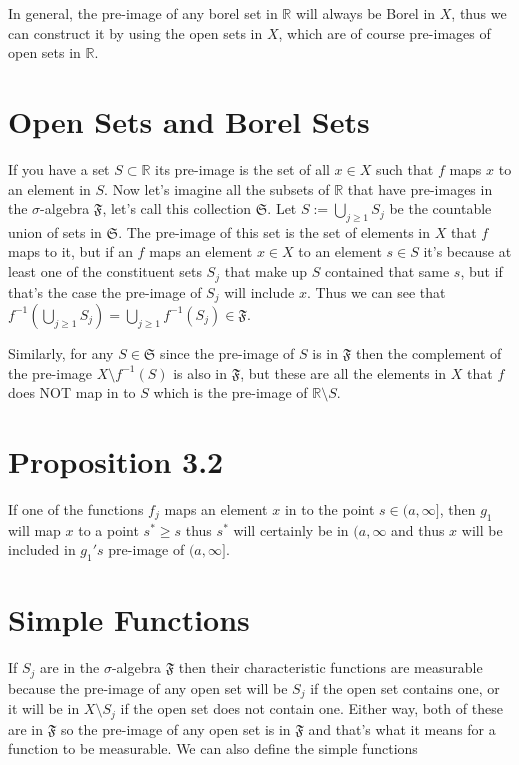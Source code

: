 \documentclass[oneside]{book}
\begin{document}
In general, the pre-image of any borel set in $\mathbb{R}$ will always be Borel in $X$, thus we can construct it by using the open sets in $X$, which are of course pre-images of open sets in $\mathbb{R}$.

\section{Open Sets and Borel Sets}
If you have a set $S \subset \mathbb{R}$ its pre-image is the set of all $x \in X$ such that $f$ maps $x$ to an element in $S$. Now let's imagine all the subsets of $\mathbb{R}$ that have pre-images in the $\sigma$-algebra $\mathfrak{F}$, let's call this collection $\mathfrak{S}$. Let $S := \bigcup_{j \ge 1} S_j$ be the countable union of sets in $\mathfrak{S}$.  The pre-image of this set is the set of elements in $X$ that $f$ maps to it, but if an $f$ maps an element  $x \in X$ to an element  $s \in S$ it's because at least one of the constituent sets $S_j$ that make up $S$ contained that same $s$, but if that's the case the pre-image of $S_j$ will include $x$. Thus we can see that $f^{-1}(\bigcup_{j \ge 1} S_j) = \bigcup_{j \ge 1} f^{-1}(S_j) \in \mathfrak{F}$.

Similarly, for any $S \in \mathfrak{S}$ since the pre-image of $S$ is in $\mathfrak{F}$ then the complement of the pre-image $X \setminus f^{-1}(S)$ is also in $\mathfrak{F}$, but these are all the elements in $X$ that $f$ does NOT map in to $S$ which is the pre-image of $\mathbb{R} \setminus S$. 

\section{Proposition 3.2} If one of the functions $f_j$ maps an element $x$ in to the point $s \in (a,\infty]$, then $g_1$ will map $x$ to a point $s^* \ge s$ thus $s^*$ will certainly be in $(a,\infty$ and thus $x$ will be included in $g_1's$ pre-image of $(a,\infty]$.

\section{Simple Functions}
If $S_j$ are in the $\sigma$-algebra $\mathfrak{F}$ then their characteristic functions are measurable because the pre-image of any open set will be $S_j$ if the open set contains one, or it will be in $X \setminus S_j$ if the open set does not contain one. Either way, both of these are in $\mathfrak{F}$ so the pre-image of any open set is in $\mathfrak{F}$ and that's what it means for a function to be measurable. We can also define the simple functions
\end{document}
